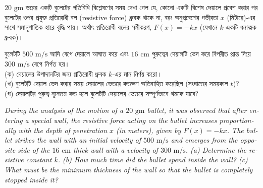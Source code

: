 \documentclass[12pt, a4paper]{article}
\begin{document}
\begin{tcolorbox}[questionbox={প্রশ্ন (Question) 8}]
\noindent
$20\text{ gm}$ ভরের একটি বুলেটের গতিবিধি বিশ্লেষণের সময় দেখা গেল যে, কোনো একটি বিশেষ দেয়ালে প্রবেশ করার পর বুলেটের ওপর প্রযুক্ত প্রতিরোধী বল (resistive force) ধ্রুবক থাকে না, বরং অনুপ্রবেশের গভীরতা $x$ (মিটারে)-এর সাথে সমানুপাতিক হারে বৃদ্ধি পায়। অর্থাৎ প্রতিরোধী বলের সমীকরণ, $F(x) = -k x$ (যেখানে $k$ একটি ধনাত্মক ধ্রুবক)। 

\vspace{0.3em}
\noindent
বুলেটটি $500\text{ m/s}$ আদি বেগে দেয়ালে আঘাত করে এবং $16\text{ cm}$ পুরুত্বের দেয়ালটি ভেদ করে বিপরীত প্রান্ত দিয়ে $300\text{ m/s}$ বেগে নির্গত হয়। \\
(ক) দেয়ালের উপাদানটির জন্য প্রতিরোধী ধ্রুবক $k$-এর মান নির্ণয় করো। \\
(খ) বুলেটটি দেয়াল ভেদ করার সময় দেয়ালের ভেতরে কতক্ষণ অতিবাহিত করেছিল (সংঘাতের সময়কাল $t$)? \\
(গ) দেয়ালটির পুরুত্ব ন্যূনতম কত হলে বুলেটটি দেয়ালের ভেতরে সম্পূর্ণভাবে থমকে যাবে?

\vspace{0.8em}
\begin{english}
\noindent\textit{\color{darkgray}
During the analysis of the motion of a $20\text{ gm}$ bullet, it was observed that after entering a special wall, the resistive force acting on the bullet increases proportionally with the depth of penetration $x$ (in meters), given by $F(x) = -k x$. The bullet strikes the wall with an initial velocity of $500\text{ m/s}$ and emerges from the opposite side of the $16\text{ cm}$ thick wall with a velocity of $300\text{ m/s}$. (a) Determine the resistive constant $k$. (b) How much time did the bullet spend inside the wall? (c) What must be the minimum thickness of the wall so that the bullet is completely stopped inside it?
}
\end{english}
\end{tcolorbox}
\end{document}
